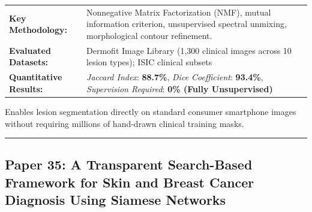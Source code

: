 \documentclass[10pt,a4paper]{article}
\begin{document}
\vspace{4pt}
\begin{tabularx}{\linewidth}{p{3.2cm}X}
\toprule
\textbf{Key Methodology:} & Nonnegative Matrix Factorization (NMF), mutual information criterion, unsupervised spectral unmixing, morphological contour refinement. \\
\textbf{Evaluated Datasets:} & Dermofit Image Library (1,300 clinical images across 10 lesion types); ISIC clinical subsets \\
\textbf{Quantitative Results:} & \textit{Jaccard Index}: \textbf{88.7\%}, \textit{Dice Coefficient}: \textbf{93.4\%}, \textit{Supervision Required}: \textbf{0\% (Fully Unsupervised)} \\
\bottomrule
\end{tabularx}
\vspace{4pt}
\begin{tcolorbox}[utilitybox,title=Clinical Utility and Real-World Impact]
Enables lesion segmentation directly on standard consumer smartphone images without requiring millions of hand-drawn clinical training masks.
\end{tcolorbox}
\vspace{12pt}
\hrule
\vspace{12pt}
\subsection*{Paper 35: A Transparent Search-Based Framework for Skin and Breast Cancer Diagnosis Using Siamese Networks}
\end{document}
